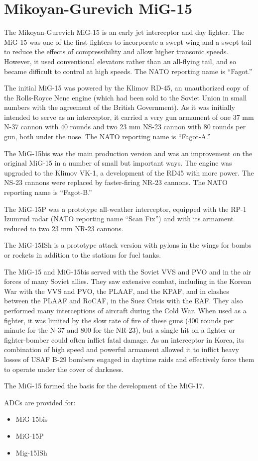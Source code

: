 \section*{Mikoyan-Gurevich MiG-15}

The Mikoyan-Gurevich MiG-15 is an early jet interceptor and day fighter. The MiG-15 was one of the first fighters to incorporate a swept wing and a swept tail to reduce the effects of compressibility and allow higher transonic speeds. However, it used conventional elevators rather than an all-flying tail, and so became difficult to control at high speeds. The NATO reporting name is “Fagot.”

The initial MiG-15 was powered by the Klimov RD-45, an unauthorized copy of the Rolls-Royce Nene engine (which had been sold to the Soviet Union in small numbers with the agreement of the British Government). As it was initially intended to serve as an interceptor, it carried a very gun armament of one 37 mm N-37 cannon with 40 rounds and two 23 mm NS-23 cannon with 80 rounds per gun, both under the nose. The NATO reporting name is “Fagot-A.”

The MiG-15bis was the main production version and was an improvement on the original MiG-15 in a number of small but important ways. The engine was upgraded to the Klimov VK-1, a development of the RD45 with more power. The NS-23 cannons were replaced by faster-firing NR-23 cannons. The NATO reporting name is “Fagot-B.”

The MiG-15P was a prototype all-weather interceptor, equipped with the RP-1 Izumrud radar (NATO reporting name “Scan Fix”) and with its armament reduced to two 23 mm NR-23 cannons.

The MiG-15ISh is a prototype attack version with pylons in the wings for bombs or rockets in addition to the stations for fuel tanks.

The MiG-15 and MiG-15bis served with the Soviet VVS and PVO and in the air forces of many Soviet allies. They saw extensive combat, including in the Korean War with the VVS and PVO, the PLAAF, and the KPAF, and in clashes between the PLAAF and RoCAF, in the Suez Crisis with the EAF. They also performed many interceptions of aircraft during the Cold War. When used as a fighter, it was limited by the slow rate of fire of these guns (400 rounds per minute for the N-37 and 800 for the NR-23), but a single hit on a fighter or fighter-bomber could often inflict fatal damage. As an interceptor in Korea, its combination of high speed and powerful armament allowed it to inflict heavy losses of USAF B-29 bombers engaged in daytime raids and effectively force them to operate under the cover of darkness.

The MiG-15 formed the basis for the development of the MiG-17.

ADCs are provided for:
\begin{itemize}
    \item MiG-15bis
    \item MiG-15P
    \item Mig-15ISh
\end{itemize}

